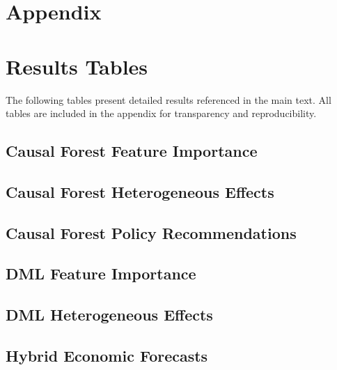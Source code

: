 \appendix
\section{Appendix}



\section{Results Tables}

The following tables present detailed results referenced in the main text. All tables are included in the appendix for transparency and reproducibility.


\subsection{Causal Forest Feature Importance}
\label{app:cf_feature_importance}

\subsection{Causal Forest Heterogeneous Effects}
\label{app:cf_heterogeneous_effects}

\subsection{Causal Forest Policy Recommendations}
\label{app:cf_policy_recommendations}

\subsection{DML Feature Importance}
\label{app:dml_feature_importance}

\subsection{DML Heterogeneous Effects}
\label{app:dml_heterogeneous_effects}

\subsection{Hybrid Economic Forecasts}
\label{app:hybrid_economic_forecasts}

